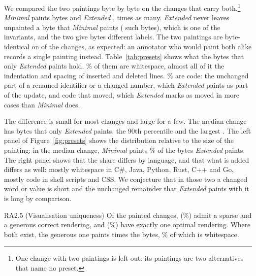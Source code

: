 \documentclass[sigconf,review]{acmart}
\begin{document}
We compared the two paintings byte by byte on the \PresetCensusFixtures{} changes that carry
both.\footnote{One change with two paintings is left out: its paintings are two alternatives
that name no preset.} \emph{Minimal} paints \PresetMinimalBytes{} bytes and \emph{Extended}
\PresetExtendedBytes{}, \PresetExtendedOverMinimal{} times as many. \emph{Extended} never leaves
unpainted a byte that \emph{Minimal} paints (\PresetMinimalOnlyBytes{} such bytes), which is one of
the invariants, and the two give \PresetRelabelledBytes{} bytes different labels. The two paintings
are byte-identical on \PresetIdenticalFixtures{} of the changes, as expected: an annotator who
would paint both alike records a single painting instead. Table~\ref{tab:presets} shows what the
\PresetAddedBytes{} bytes that only \emph{Extended} paints hold. \PresetAddedWhitespacePct{}\% of
them are whitespace, almost all of it the indentation and spacing of inserted and deleted lines.
\PresetAddedCodePct{}\% are code: the unchanged part of a renamed identifier or a changed number,
which \emph{Extended} paints as part of the update, and code that moved, which \emph{Extended} marks
as moved in more cases than \emph{Minimal} does.

The difference is small for most changes and large for a few. The median change has
\PresetExtraMedian{} bytes that only \emph{Extended} paints, the 90th percentile
\PresetExtraPNinety{} and the largest \PresetExtraMax{}. The left panel of
Figure~\ref{fig:presets} shows the distribution relative to the size of the painting: in the
median change, \emph{Minimal} paints \PresetKeptMedianPct{}\% of the bytes \emph{Extended} paints.
The right panel shows that the share differs by language, and that what is added differs as
well: mostly whitespace in C\#, Java, Python, Rust, C++ and Go, mostly code in shell scripts and
CSS. We conjecture
that in those two a changed word or value is short and the unchanged remainder that \emph{Extended}
paints with it is long by comparison.

\begin{resultbox}{RA2.5 (Visualisation uniqueness)}
  Of the \PresetPainted{} painted changes, \PresetBothFixtures{} (\PresetBothPct{}\%) admit a
  sparse and a generous correct rendering, and \PresetSingleFixtures{} (\PresetSinglePct{}\%)
  have exactly one optimal rendering. Where both exist, the generous one paints
  \PresetExtendedOverMinimal{} times the bytes, \PresetAddedWhitespacePct{}\% of which is
  whitespace.
\end{resultbox}
\end{document}

